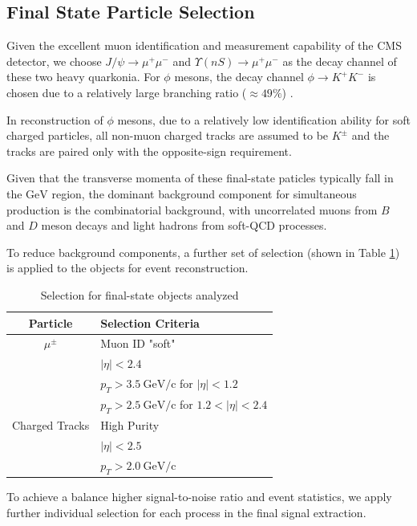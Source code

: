 \documentclass[10pt,twocolumn]{article}
\newcommand*{\GeVc}{~\text{GeV/c}}
\begin{document}
\subsection{Final State Particle Selection}

Given the excellent muon identification and measurement capability of the CMS detector,  we choose $J/\psi\to\mu^+\mu^-$ and $\Upsilon(nS)\to\mu^+\mu^-$ as the decay channel of these two heavy quarkonia. For $\phi$ mesons, the decay channel $\phi\to K^+K^-$ is chosen due to a relatively large branching ratio ($\approx 49\%$) \cite{PDG2020}.

In reconstruction of $\phi$ mesons, due to a relatively low identification ability for soft charged particles, all non-muon charged tracks are assumed to be $K^\pm$ and the tracks are paired only with the opposite-sign requirement.

Given that the transverse momenta of these final-state paticles typically fall in the $\text{GeV}$ region, the dominant background component for simultaneous production is the combinatorial background, with uncorrelated muons from $B$ and $D$ meson decays and light hadrons from soft-QCD processes.

To reduce background components, a further set of selection (shown in Table \ref{tab:mu_K_cuts}) is applied to the objects for event reconstruction.

\begin{table}[H]
    \centering
    \caption{Selection for final-state objects analyzed}
    \begin{tabular}{cl}
    \toprule
    Particle & Selection Criteria \\
    \midrule
    $\mu^\pm$ & Muon ID "soft" \\
              & $|\eta| < 2.4$ \\
              & $p_T > 3.5\GeVc$ for $|\eta| < 1.2$ \\
              & $p_T > 2.5\GeVc$ for $1.2 < |\eta| < 2.4$ \\
              \midrule
    Charged Tracks & High Purity \\
              & $|\eta|<2.5$ \\
              & $p_T > 2.0 \GeVc$ \\
    \bottomrule
    \end{tabular}
    \label{tab:mu_K_cuts}
\end{table}

To achieve a balance higher signal-to-noise ratio and event statistics, we apply further individual selection for each process in the final signal extraction.
\end{document}
